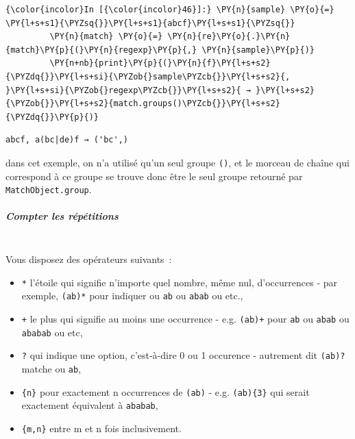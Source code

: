     \begin{Verbatim}[commandchars=\\\{\}]
{\color{incolor}In [{\color{incolor}46}]:} \PY{n}{sample} \PY{o}{=} \PY{l+s+s1}{\PYZsq{}}\PY{l+s+s1}{abcf}\PY{l+s+s1}{\PYZsq{}}
         \PY{n}{match} \PY{o}{=} \PY{n}{re}\PY{o}{.}\PY{n}{match}\PY{p}{(}\PY{n}{regexp}\PY{p}{,} \PY{n}{sample}\PY{p}{)}
         \PY{n+nb}{print}\PY{p}{(}\PY{n}{f}\PY{l+s+s2}{\PYZdq{}}\PY{l+s+si}{\PYZob{}sample\PYZcb{}}\PY{l+s+s2}{, }\PY{l+s+si}{\PYZob{}regexp\PYZcb{}}\PY{l+s+s2}{ → }\PY{l+s+s2}{\PYZob{}}\PY{l+s+s2}{match.groups()\PYZcb{}}\PY{l+s+s2}{\PYZdq{}}\PY{p}{)}
\end{Verbatim}


    \begin{Verbatim}[commandchars=\\\{\}]
abcf, a(bc|de)f → ('bc',)

    \end{Verbatim}

    dans cet exemple, on n'a utilisé qu'un seul groupe \texttt{()}, et le
morceau de chaîne qui correspond à ce groupe se trouve donc être le seul
groupe retourné par \texttt{MatchObject.group}.

    \hypertarget{compter-les-ruxe9puxe9titions}{%
\subparagraph{Compter les
répétitions\\\\}\label{compter-les-ruxe9puxe9titions}}

    Vous disposez des opérateurs suivants~:
    
\begin{itemize}
	\item 
	\texttt{*} l'étoile qui
	signifie n'importe quel nombre, même nul, d'occurrences - par exemple,
	\texttt{(ab)*} pour indiquer
	\texttt{\textquotesingle{}\textquotesingle{}} ou
	\texttt{\textquotesingle{}ab\textquotesingle{}} ou
	\texttt{\textquotesingle{}abab\textquotesingle{}} ou etc.,
	\item
	\texttt{+}
	le plus qui signifie au moins une occurrence - e.g. \texttt{(ab)+} pour
	\texttt{ab} ou \texttt{abab} ou \texttt{ababab} ou etc,
	\item
	\texttt{?} qui
	indique une option, c'est-à-dire 0 ou 1 occurence - autrement dit
	\texttt{(ab)?} matche \texttt{\textquotesingle{}\textquotesingle{}} ou
	\texttt{ab},
	\item
	\texttt{\{n\}} pour exactement n occurrences de
	\texttt{(ab)} - e.g. \texttt{(ab)\{3\}} qui serait exactement équivalent
	à \texttt{ababab},
	\item
	\texttt{\{m,n\}} entre m et n fois inclusivement.
\end{itemize}

